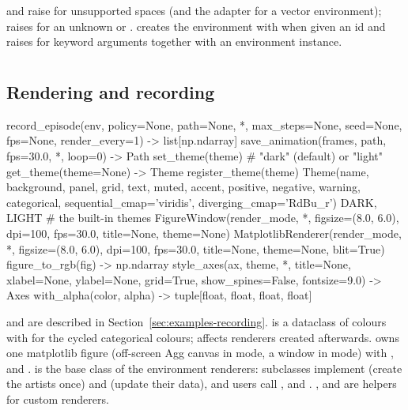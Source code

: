  and  raise 
for unsupported spaces (and the adapter for a vector environment);
 raises  for an unknown  or
.  creates the environment with
 when given an id and raises  for keyword
arguments together with an environment instance.

\section{\texorpdfstring{}{env\_lib.utils}}\label{sec:api-utils}

\subsection{Rendering and recording}

\begin{pycode}
record_episode(env, policy=None, path=None, *, max_steps=None, seed=None,
               fps=None, render_every=1) -> list[np.ndarray]
save_animation(frames, path, fps=30.0, *, loop=0) -> Path
set_theme(theme)                          # "dark" (default) or "light"
get_theme(theme=None) -> Theme
register_theme(theme)
Theme(name, background, panel, grid, text, muted, accent, positive, negative,
      warning, categorical, sequential_cmap='viridis', diverging_cmap='RdBu_r')
DARK, LIGHT                               # the built-in themes
FigureWindow(render_mode, *, figsize=(8.0, 6.0), dpi=100, fps=30.0, title=None,
             theme=None)
MatplotlibRenderer(render_mode, *, figsize=(8.0, 6.0), dpi=100, fps=30.0,
                   title=None, theme=None, blit=True)
figure_to_rgb(fig) -> np.ndarray
style_axes(ax, theme, *, title=None, xlabel=None, ylabel=None, grid=True,
           show_spines=False, fontsize=9.0) -> Axes
with_alpha(color, alpha) -> tuple[float, float, float, float]
\end{pycode}

 and  are described in
Section~\ref{sec:examples-recording}.  is a dataclass of colours
with  for the cycled categorical colours;
 affects renderers created afterwards. 
owns one matplotlib figure (off-screen Agg canvas in  mode,
a window in  mode) with ,  and
.  is the base class of the
environment renderers: subclasses implement  (create the
artists once) and  (update their data), and users call
,  and .
,  and  are helpers
for custom renderers.

